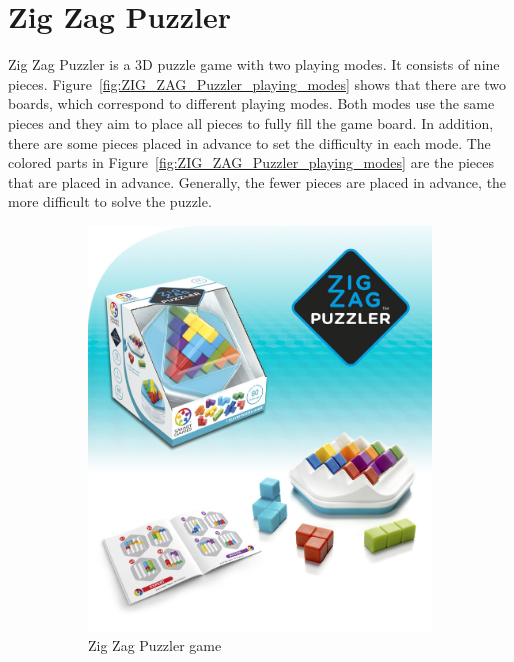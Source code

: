 \section{Zig Zag Puzzler}
Zig Zag Puzzler is a 3D puzzle game with two playing modes. It consists of nine pieces. Figure~\ref{fig:ZIG_ZAG_Puzzler_playing_modes} shows that there are two boards, which correspond to different playing modes. Both modes use the same pieces and they aim to place all pieces to fully fill the game board. In addition, there are some pieces placed in advance to set the difficulty in each mode. The colored parts in Figure~\ref{fig:ZIG_ZAG_Puzzler_playing_modes} are the pieces that are placed in advance. Generally, the fewer pieces are placed in advance, the more difficult to solve the puzzle.
\begin{figure}[htbp]
    \centering
    \begin{subfigure}[b]{0.32\textwidth}
    \includegraphics[width=\textwidth]{figs/zigzagdescription.jpg}
    \caption{Zig Zag Puzzler game}
    \end{subfigure}
    \begin{subfigure}[b]{0.32\textwidth}

\end{subfigure}
\end{figure}
